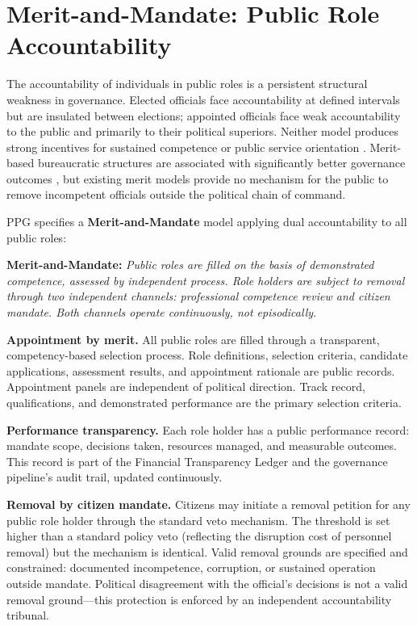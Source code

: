 \documentclass[12pt,a4paper,oneside]{report}
\begin{document}
\section{Merit-and-Mandate: Public Role Accountability}
\label{sec:merit}

The accountability of individuals in public roles is a persistent structural weakness in governance. Elected officials face accountability at defined intervals but are insulated between elections; appointed officials face weak accountability to the public and primarily to their political superiors. Neither model produces strong incentives for sustained competence or public service orientation \citep{rauch2000bureaucratic}. Merit-based bureaucratic structures are associated with significantly better governance outcomes \citep{rauch2000bureaucratic}, but existing merit models provide no mechanism for the public to remove incompetent officials outside the political chain of command.

PPG specifies a \textbf{Merit-and-Mandate} model applying dual accountability to all public roles:

\begin{mdframed}
\textbf{Merit-and-Mandate:} \textit{Public roles are filled on the basis of demonstrated competence, assessed by independent process. Role holders are subject to removal through two independent channels: professional competence review and citizen mandate. Both channels operate continuously, not episodically.}
\end{mdframed}

\textbf{Appointment by merit.} All public roles are filled through a transparent, competency-based selection process. Role definitions, selection criteria, candidate applications, assessment results, and appointment rationale are public records. Appointment panels are independent of political direction. Track record, qualifications, and demonstrated performance are the primary selection criteria.

\textbf{Performance transparency.} Each role holder has a public performance record: mandate scope, decisions taken, resources managed, and measurable outcomes. This record is part of the Financial Transparency Ledger and the governance pipeline's audit trail, updated continuously.

\textbf{Removal by citizen mandate.} Citizens may initiate a removal petition for any public role holder through the standard veto mechanism. The threshold is set higher than a standard policy veto (reflecting the disruption cost of personnel removal) but the mechanism is identical. Valid removal grounds are specified and constrained: documented incompetence, corruption, or sustained operation outside mandate. Political disagreement with the official's decisions is not a valid removal ground---this protection is enforced by an independent accountability tribunal.
\end{document}
